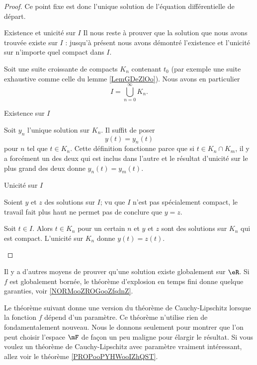 \begin{proof}
    Ce point fixe est donc l'unique solution de l'équation différentielle de départ.

    \begin{subproof}
        \item[Existence et unicité sur \( I\)]
            Il nous reste à prouver que la solution que nous avons trouvée existe sur \( I\) : jusqu'à présent nous avons démontré l'existence et l'unicité sur n'importe quel compact dans \( I\).

            Soit une suite croissante de compacts \( K_n\) contenant \( t_0\) (par exemple une suite exhaustive comme celle du lemme \ref{LemGDeZlOo}). Nous avons en particulier
            \begin{equation}
                I=\bigcup_{n=0}^{\infty}K_n.
            \end{equation}
        \item[Existence sur \( I\)]
        
            Soit \( y_n\) l'unique solution sur \( K_n\). Il suffit de poser
            \begin{equation}
                y(t)=y_n(t)
            \end{equation}
            pour \( n\) tel que \( t\in K_n\). Cette définition fonctionne parce que si \( t\in K_n\cap K_m\), il y a forcément un des deux qui est inclus dans l'autre et le résultat d'unicité sur le plus grand des deux donne \( y_n(t)=y_m(t)\).

        \item[Unicité sur \( I\)]

            Soient \( y\) et \(z \) des solutions sur \( I\); vu que \( I\) n'est pas spécialement compact, le travail fait plus haut ne permet pas de conclure que \( y=z\). 

            Soit \( t\in I\). Alors \( t\in K_n\) pour un certain \( n\) et \( y\) et \( z\) sont des solutions sur \( K_n\) qui est compact. L'unicité sur \( K_n\) donne \( y(t)=z(t)\).
    \end{subproof}
\end{proof}

\begin{normaltext}
    Il y a d'autres moyens de prouver qu'une solution existe globalement sur \( \eR\). Si \( f\) est globalement bornée, le théorème d'explosion en temps fini donne quelque garanties, voir \ref{NORMooZROGooZfsdnZ}.
\end{normaltext}

Le théorème suivant donne une version du théorème de Cauchy-Lipschitz lorsque la fonction \( f\) dépend d'un paramètre. Ce théorème n'utilise rien de fondamentalement nouveau. Nous le donnons seulement pour montrer que l'on peut choisir l'espace \( \mF\) de façon un peu maligne pour élargir le résultat. Si vous voulez un théorème de Cauchy-Lipschitz avec paramètre vraiment intéressant, allez voir le théorème \ref{PROPooPYHWooIZhQST}.

